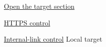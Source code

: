 \documentclass{article}
\begin{document}
\href{target.pdf#section.1}{Open the target section}

\href{https://example.com/}{HTTPS control}

\hyperlink{local-target}{Internal-link control}
\newpage
\hypertarget{local-target}{Local target}
\end{document}
